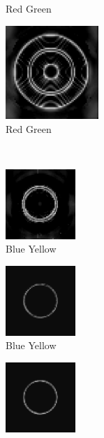 \documentclass[journal,onecolumn]{IEEEtran}
\begin{document}
{\begin{figure}[H]
\begin{subfigure}[b]{0.25\textwidth}
            \caption{Red Green}
            \label{fig:test-circle-a2-opp-rg-mask}
    \end{subfigure}%
    \begin{subfigure}[b]{0.25\textwidth}
            \centering
            \includegraphics[width=100pt, frame]{test-circle-a2-opp-rg}
            \caption{Red Green}
            \label{fig:test-circle-a2-opp-rg}
    \end{subfigure}\\
    \begin{subfigure}[b]{0.25\textwidth}
            \centering
            \includegraphics[width=100px, frame]{test-circle-a1-opp-by}
            \caption{Blue Yellow}
            \label{fig:test-circle-a1-opp-by}
    \end{subfigure}%
    \begin{subfigure}[b]{0.25\textwidth}
            \centering
            \includegraphics[width=100px, frame]{test-circle-a1-opp-by-mask}
            \caption{Blue Yellow}
            \label{fig:test-circle-a1-opp-by-mask}
    \end{subfigure}%
    \begin{subfigure}[b]{0.25\textwidth}
            \centering
            \includegraphics[width=100px, frame]{test-circle-a2-opp-by-mask}

\end{subfigure}
\end{figure}}
\end{document}
